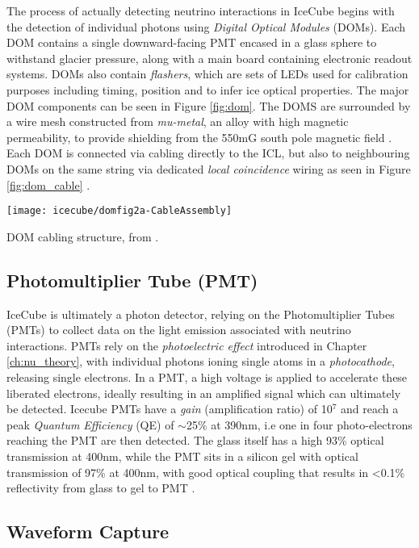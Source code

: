The process of actually detecting neutrino interactions in IceCube begins with the detection of individual photons using \emph{Digital Optical Modules} (DOMs). Each DOM contains a single downward-facing PMT encased in a glass sphere to withstand glacier pressure, along with a main board containing electronic readout systems. DOMs also contain \emph{flashers}, which are sets of LEDs used for calibration purposes including timing, position and to infer ice optical properties. The major DOM components can be seen in Figure \ref{fig:dom}. The DOMS are surrounded by a wire mesh constructed from \emph{mu-metal}, an alloy with high magnetic permeability, to provide shielding from the 550mG south pole magnetic field \cite{icecube_detector_17}.  Each DOM is connected via cabling directly to the ICL, but also to neighbouring DOMs on the same string via dedicated \emph{local coincidence} wiring as seen in Figure \ref{fig:dom_cable} \cite{icecube_detector_17}.

\begin{marginfigure}
	\centering \texttt{[image: icecube/domfig2a-CableAssembly]}
	\caption{DOM cabling structure, from \cite{icecube_detector_17}.}
	\label{fig:dom_cable}
\end{marginfigure} 

\subsection*{Photomultiplier Tube (PMT)}

IceCube is ultimately a photon detector, relying on the Photomultiplier Tubes (PMTs) to collect data on the light emission associated with neutrino interactions. PMTs rely on the \emph{photoelectric effect} introduced in Chapter \ref{ch:nu_theory}, with individual photons ioning single atoms in a \emph{photocathode}, releasing single electrons. In a PMT, a high voltage is applied to accelerate these liberated electrons, ideally resulting in an amplified signal which can ultimately be detected. Icecube PMTs have a \emph{gain} (amplification ratio) of 10$^{7}$ and reach a peak \emph{Quantum Efficiency} (QE) of $\sim$25\% at 390nm, i.e one in four photo-electrons reaching the PMT are then detected. The glass itself has a high 93\% optical transmission at 400nm, while the PMT sits in a silicon gel with optical transmission of 97\% at 400nm, with good optical coupling that results in <0.1\% reflectivity from glass to gel to PMT \cite{icecube_detector_17}. 

\subsection*{Waveform Capture}

